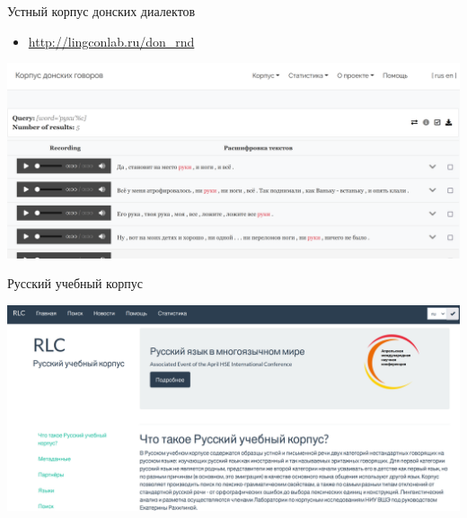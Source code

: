 \documentclass[
  ignorenonframetext,
]{beamer}
\providecommand{\tightlist}{%
  \setlength{\itemsep}{0pt}\setlength{\parskip}{0pt}}
\begin{document}
\begin{frame}{Устный корпус донских диалектов}
\protect\hypertarget{ux443ux441ux442ux43dux44bux439-ux43aux43eux440ux43fux443ux441-ux434ux43eux43dux441ux43aux438ux445-ux434ux438ux430ux43bux435ux43aux442ux43eux432-1}{}
\begin{itemize}
\tightlist
\item
  \url{http://lingconlab.ru/don_rnd}
\end{itemize}

\begin{center}\includegraphics[width=0.98\linewidth]{images/don2} \end{center}
\end{frame}

\begin{frame}{Русский учебный корпус}
\protect\hypertarget{ux440ux443ux441ux441ux43aux438ux439-ux443ux447ux435ux431ux43dux44bux439-ux43aux43eux440ux43fux443ux441}{}
\begin{center}\includegraphics[width=0.98\linewidth]{images/RLC} \end{center}
\end{frame}
\end{document}
